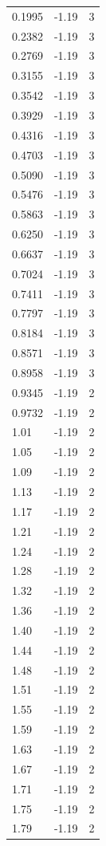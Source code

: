 \begin{longtable}{lrr}
  0.1995 & -1.19 & 3 \\
  0.2382 & -1.19 & 3 \\
  0.2769 & -1.19 & 3 \\
  0.3155 & -1.19 & 3 \\
  0.3542 & -1.19 & 3 \\
  0.3929 & -1.19 & 3 \\
  0.4316 & -1.19 & 3 \\
  0.4703 & -1.19 & 3 \\
  0.5090 & -1.19 & 3 \\
  0.5476 & -1.19 & 3 \\
  0.5863 & -1.19 & 3 \\
  0.6250 & -1.19 & 3 \\
  0.6637 & -1.19 & 3 \\
  0.7024 & -1.19 & 3 \\
  0.7411 & -1.19 & 3 \\
  0.7797 & -1.19 & 3 \\
  0.8184 & -1.19 & 3 \\
  0.8571 & -1.19 & 3 \\
  0.8958 & -1.19 & 3 \\
  0.9345 & -1.19 & 2 \\
  0.9732 & -1.19 & 2 \\
  1.01 & -1.19 & 2 \\
  1.05 & -1.19 & 2 \\
  1.09 & -1.19 & 2 \\
  1.13 & -1.19 & 2 \\
  1.17 & -1.19 & 2 \\
  1.21 & -1.19 & 2 \\
  1.24 & -1.19 & 2 \\
  1.28 & -1.19 & 2 \\
  1.32 & -1.19 & 2 \\
  1.36 & -1.19 & 2 \\
  1.40 & -1.19 & 2 \\
  1.44 & -1.19 & 2 \\
  1.48 & -1.19 & 2 \\
  1.51 & -1.19 & 2 \\
  1.55 & -1.19 & 2 \\
  1.59 & -1.19 & 2 \\
  1.63 & -1.19 & 2 \\
  1.67 & -1.19 & 2 \\
  1.71 & -1.19 & 2 \\
  1.75 & -1.19 & 2 \\
  1.79 & -1.19 & 2 \\

\end{longtable}
